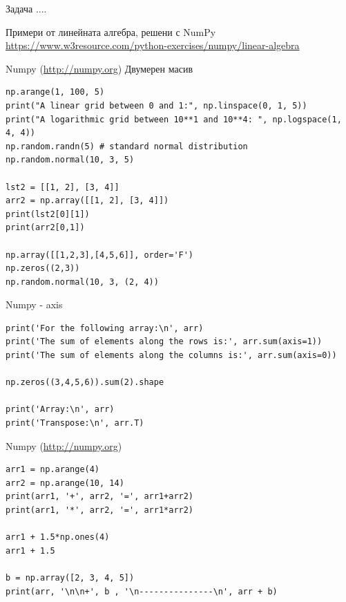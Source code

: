 \documentclass{beamer}
\begin{document}
\begin{frame}{Задача}
  ....
\end{frame}

\begin{frame}{Примери от линейната алгебра, решени с NumPy}
    \url{https://www.w3resource.com/python-exercises/numpy/linear-algebra}
\end{frame}











\begin{frame}[fragile]{Numpy (\url{http://numpy.org}) Двумерен масив}
\begin{lstlisting}
np.arange(1, 100, 5)
print("A linear grid between 0 and 1:", np.linspace(0, 1, 5))
print("A logarithmic grid between 10**1 and 10**4: ", np.logspace(1, 4, 4))
np.random.randn(5) # standard normal distribution
np.random.normal(10, 3, 5)

lst2 = [[1, 2], [3, 4]]
arr2 = np.array([[1, 2], [3, 4]])
print(lst2[0][1])
print(arr2[0,1])

np.array([[1,2,3],[4,5,6]], order='F')
np.zeros((2,3))
np.random.normal(10, 3, (2, 4))
\end{lstlisting}

\end{frame}



\begin{frame}[fragile]{Numpy - axis }
\begin{lstlisting}
print('For the following array:\n', arr)
print('The sum of elements along the rows is:', arr.sum(axis=1))
print('The sum of elements along the columns is:', arr.sum(axis=0))

np.zeros((3,4,5,6)).sum(2).shape

print('Array:\n', arr)
print('Transpose:\n', arr.T)
\end{lstlisting}

\end{frame}

\begin{frame}[fragile]{Numpy (\url{http://numpy.org}) }
\begin{lstlisting}
arr1 = np.arange(4)
arr2 = np.arange(10, 14)
print(arr1, '+', arr2, '=', arr1+arr2)
print(arr1, '*', arr2, '=', arr1*arr2)

arr1 + 1.5*np.ones(4)
arr1 + 1.5

b = np.array([2, 3, 4, 5])
print(arr, '\n\n+', b , '\n---------------\n', arr + b)
\end{lstlisting}

\end{frame}
\end{document}
